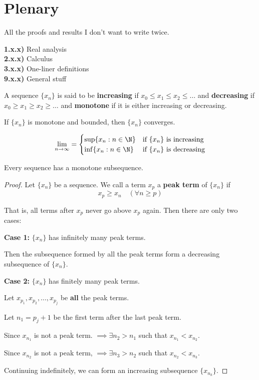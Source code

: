 \section{Plenary}\label{80eeafc}

All the proofs and results I don't want to write twice.

\textbf{1.x.x)} Real analysis \\
\textbf{2.x.x)} Calculus \\
\textbf{3.x.x)} One-liner definitions \\
\textbf{9.x.x)} General stuff \\

\label{d5142a8}

A sequence $\{x_n\}$ is said to be \textbf{increasing} if $x_0\leq
	x_1\leq x_2\leq\ldots$ and \textbf{decreasing} if $x_0\geq x_1\geq
	x_2\geq\ldots$ and \textbf{monotone} if it is either increasing or
decreasing.

\label{ca25eb7}

If $\{x_n\}$ is monotone and bounded, then $\{x_n\}$ converges.

$$
	\lim_{n\to\infty}=\begin{cases}
		\sup\{x_n:n\in\N\} & \text{if $\{x_n\}$ is increasing} \\
		\inf\{x_n:n\in\N\} & \text{if $\{x_n\}$ is decreasing}
	\end{cases}
$$

\label{dddb70e}

Every sequence has a monotone subsequence.

\begin{proof}
	\def\xn{\{x_n\}}

	Let $\xn$ be a sequence. We call a term $x_p$ a \textbf{peak term}
	of $\xn$ if
	$$x_p\geq x_n\quad(\forall n\geq p)$$

	That is, all terms after $x_p$ never go above $x_p$ again. Then
	there are only two cases:

	\textbf{Case 1:} $\xn$ has infinitely many peak terms.

	Then the subsequence formed by all the peak terms form a decreasing
	subsequence of $\xn$.

	\textbf{Case 2:} $\xn$ has finitely many peak terms.

	Let $x_{p_1},x_{p_2},\ldots,x_{p_j}$ be \textbf{all} the peak terms.

	Let $n_1=p_j+1$ be the first term after the last peak term.

	Since $x_{n_1}$ is not a peak term. $\implies\exists n_2>n_1$ such
	that $x_{n_1}<x_{n_2}$.

	Since $x_{n_2}$ is not a peak term, $\implies\exists n_3>n_2$ such
	that $x_{n_2}<x_{n_3}$.

	Continuing indefinitely, we can form an increasing subsequence
	$\{x_{n_k}\}$.
\end{proof}

